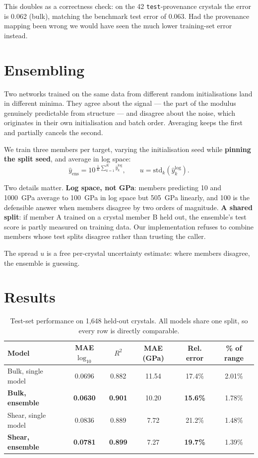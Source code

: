 \documentclass[11pt,a4paper]{article}
\begin{document}
This doubles as a correctness check: on the 42 \texttt{test}-provenance
crystals the error is 0.062 (bulk), matching the benchmark test error of 0.063.
Had the provenance mapping been wrong we would have seen the much lower
training-set error instead.

\section{Ensembling}

Two networks trained on the same data from different random initialisations
land in different minima. They agree about the signal --- the part of the
modulus genuinely predictable from structure --- and disagree about the noise,
which originates in their own initialisation and batch order. Averaging keeps
the first and partially cancels the second.

We train three members per target, varying the initialisation seed while
\textbf{pinning the split seed}, and average in log space:
\begin{equation}
  \hat{y}_{\mathrm{ens}} = 10^{\,\frac{1}{K}\sum_{k=1}^{K}\hat{y}_k^{\log}},
  \qquad
  u = \mathrm{std}_k\!\left(\hat{y}_k^{\log}\right).
\end{equation}

Two details matter. \textbf{Log space, not GPa}: members predicting 10 and
1000~GPa average to 100~GPa in log space but 505~GPa linearly, and 100 is the
defensible answer when members disagree by two orders of magnitude. \textbf{A
shared split}: if member A trained on a crystal member B held out, the
ensemble's test score is partly measured on training data. Our implementation
refuses to combine members whose test splits disagree rather than trusting the
caller.

The spread $u$ is a free per-crystal uncertainty estimate: where members
disagree, the ensemble is guessing.

\section{Results}

\begin{table}[h]
\centering
\caption{Test-set performance on 1{,}648 held-out crystals. All models share
one split, so every row is directly comparable.}
\begin{tabular}{lccccc}
\toprule
Model & MAE $\log_{10}$ & $R^2$ & MAE (GPa) & Rel. error & \% of range \\
\midrule
Bulk, single model      & 0.0696 & 0.882 & 11.54 & 17.4\% & 2.01\% \\
\textbf{Bulk, ensemble} & \textbf{0.0630} & \textbf{0.901} & 10.20
  & \textbf{15.6\%} & 1.78\% \\
Shear, single model      & 0.0836 & 0.889 & 7.72 & 21.2\% & 1.48\% \\
\textbf{Shear, ensemble} & \textbf{0.0781} & \textbf{0.899} & 7.27
  & \textbf{19.7\%} & 1.39\% \\
\bottomrule
\end{tabular}
\end{table}
\end{document}
